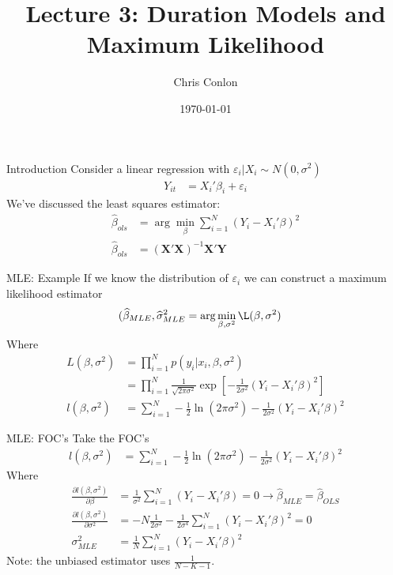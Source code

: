 \documentclass[aspectratio=169]{beamer}
\title{Lecture 3: Duration Models and Maximum Likelihood}
\author{Chris Conlon }
\institute{NYU Stern }
\date{\today}
\begin{document}
\maketitle

\begin{frame}{Introduction}
Consider a linear regression with $\varepsilon_i | X_i \sim N(0,\sigma^2)$
\begin{align*}
Y_{it} &= X_{i}'\beta_i + \varepsilon_{i}
\end{align*}
We've discussed the \alert{least squares estimator}:
\begin{align*}
\widehat{\beta}_{ols} &= \arg \min_{\beta} \sum_{i=1}^N (Y_i - X_i' \beta)^2\\
\widehat{\beta}_{ols} &= (\mathbf{X}'\mathbf{X})^{-1} \mathbf{X}' \mathbf{Y}
\end{align*}
\end{frame}


\begin{frame}{MLE: Example}
If we know the distribution of $\varepsilon_i$ we can construct a \alert{maximum likelihood estimator}
\begin{align*}
(\widehat{\beta}_{MLE},\widehat{\sigma}^2_{MLE} &= \arg \min_{\beta,\sigma^2} \L(\beta,\sigma^2)
\end{align*}
Where 
\begin{align*} 
L(\beta,\sigma^2) &= \prod_{i=1}^N p(y_i | x_i,\beta,\sigma^2) \\
                  &= \prod_{i=1}^N \frac{1}{\sqrt{2 \pi \sigma^2}} \exp \left[-\frac{1}{2\sigma^2}(Y_i - X_i' \beta)^2 \right]\\
l(\beta,\sigma^2) &= \sum_{i=1}^N -\frac{1}{2} \ln (2 \pi \sigma^2) - \frac{1}{2 \sigma^2}(Y_i - X_i' \beta)^2
\end{align*}
\end{frame}

\begin{frame}{MLE: FOC's}
Take the FOC's
\begin{align*}
l(\beta,\sigma^2) &= \sum_{i=1}^N -\frac{1}{2} \ln (2 \pi \sigma^2) - \frac{1}{2 \sigma^2}(Y_i - X_i' \beta)^2
\end{align*}
Where 
\begin{align*} 
\frac{ \partial l(\beta,\sigma^2) }{\partial \beta}&= \frac{1}{ \sigma^2}\sum_{i=1}^N(Y_i - X_i' \beta) = 0 \rightarrow \widehat{\beta}_{MLE}= \widehat{\beta}_{OLS}\\ 
\frac{ \partial l(\beta,\sigma^2) }{\partial \sigma^2}&= -N \frac{1}{2 \sigma^2}  -  \frac{1}{2 \sigma^4} \sum_{i=1}^N(Y_i - X_i' \beta)^2 = 0 \\
\sigma^2_{MLE} &= \frac{1}{N} \sum_{i=1}^N (Y_i - X_i' \beta)^2
\end{align*}
Note: the unbiased estimator uses $\frac{1}{N-K-1}$.
\end{frame}
\end{document}
